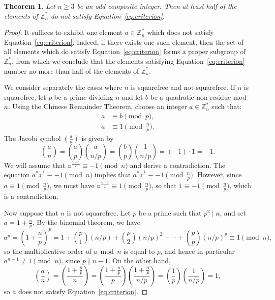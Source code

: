 \documentclass[12pt]{article}
\newcommand{\jacobi}[2]{{\genfrac{(}{)}{}{}{#1}{#2}}}
\newcommand{\Z}{\mathbb{Z}}
\newtheorem{theorem}{Theorem}
\theoremstyle{definition}
\newcommand{\ndiv}{\nmid}
\renewcommand{\div}{\mid}
\begin{document}
\begin{theorem}\label{ss-half}
Let $n \geq 3$ be an odd composite integer. Then at least half of the
elements of $\Z_n^*$ do not satisfy Equation~\eqref{eq:criterion}.
\end{theorem}
\begin{proof}
It suffices to exhibit one element $a \in \Z_n^*$ which does not satisfy Equation~\eqref{eq:criterion}. Indeed, if there exists one such element, then the set of
all elements which do satisfy Equation~\eqref{eq:criterion} forms a proper subgroup of $\Z_n^*$, from which we
conclude that the elements satisfying Equation~\eqref{eq:criterion} number no more than half of the elements
of $\Z_n^*$.

We consider separately the cases where $n$ is squarefree and not
squarefree.  If $n$ is squarefree, let $p$ be a prime dividing $n$ and
let $b$ be a quadratic non-residue mod $n$. Using the Chinese
Remainder Theorem, choose an integer $a \in \Z_n^*$ such that:
\begin{align*}
a &\equiv b \pmod{p}, \\
a &\equiv 1 \pmod{\frac{n}{p}}.
\end{align*}
The Jacobi symbol $\jacobi{a}{n}$ is given by
\[
\jacobi{a}{n} = \jacobi{a}{p} \jacobi{a}{n/p} = \jacobi{b}{p}
\jacobi{1}{n/p} = (-1) \cdot 1 = -1.
\]
We will assume that $a^{\frac{n-1}{2}} \equiv -1 \pmod{n}$ and derive
a contradiction. The equation $a^{\frac{n-1}{2}} \equiv -1 \pmod{n}$
implies that $a^{\frac{n-1}{2}} \equiv -1 \pmod{\frac{n}{p}}$.
However, since $a \equiv 1 \pmod{\frac{n}{p}}$, we must have
$a^{\frac{n-1}{2}} \equiv 1 \pmod{\frac{n}{p}}$, so that $1 \equiv -1
\pmod{\frac{n}{p}}$, which is a contradiction.

Now suppose that $n$ is not squarefree. Let $p$ be a prime such that
$p^2 \div n$, and set $a = 1 + \frac{n}{p}$. By the binomial theorem,
we have
\[
a^p = \left(1+\frac{n}{p}\right)^p = 1 +
\binom{p}{1}\left(n/p\right) +
\binom{p}{2}\left(n/p\right)^2 + \cdots +
\binom{p}{p}\left(n/p\right)^p
\equiv 1 \pmod{n},
\]
so the multiplicative order of $a \bmod n$ is equal to $p$, and hence
in particular $a^{n-1} \neq 1 \pmod{n}$, since $p \ndiv n-1$. On the
other hand,
\[
\jacobi{a}{n} = \jacobi{1+\frac{n}{p}}{n} = \jacobi{1+\frac{n}{p}}{p}
\jacobi{1+\frac{n}{p}}{n/p} = \jacobi{1}{p} \jacobi{1}{n/p} = 1,
\]
so $a$ does not satisfy Equation~\eqref{eq:criterion}.
\end{proof}

\end{document}
